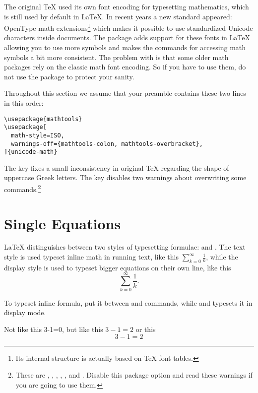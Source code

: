 The original \TeX{} used its own font encoding for typesetting mathematics,
which is still used by default in \LaTeX{}. In recent years a new standard
appeared: OpenType math extensions\footnote{Its internal structure is actually
  based on \TeX{} font tables.} which makes it possible to use standardized
Unicode characters inside documents. The  package adds
support for these fonts in \LaTeX{} allowing you to use more symbols and makes
the commands for accessing math symbols a bit more consistent. The problem with
 is that some older math packages rely on the
classic math font encoding. So if you have to use them, do not use the
 package to protect your sanity.

Throughout this section we assume that your preamble contains these two
lines in this order:
\begin{verbatim}
\usepackage{mathtools}
\usepackage[
  math-style=ISO,
  warnings-off={mathtools-colon, mathtools-overbracket},
]{unicode-math}
\end{verbatim}
The  key fixes a small inconsistency in original \TeX{}
regarding the shape of uppercase Greek letters. The  key
disables two warnings about overwriting some 
commands.\footnote{These are , ,
  , , ,  and
  . Disable this package option and read these warnings if you are
  going to use them.}

\section{Single Equations}\label{sec:single_equations}

\LaTeX{} distinguishes between two styles of typesetting formulae:
\emph{} and \emph{}. The text style is used
typeset inline math in running text, like this \(\sum_{k=0}^\infty
\frac{1}{k}\), while the display style is used to typeset bigger equations on
their own line, like this
\[
  \sum_{k=0}^\infty \frac{1}{k}.
\]

To typeset inline formula, put it between \csi{(} and \csi{)} commands, while
\csi{[} and \csi{]} typesets it in display mode.
\begin{chktexignore}  
\begin{example}
Not like this 3-1=0,
but like this \(3-1=2\)
or this
\[
  3 - 1 = 2
\]
\end{example}
\end{chktexignore}

